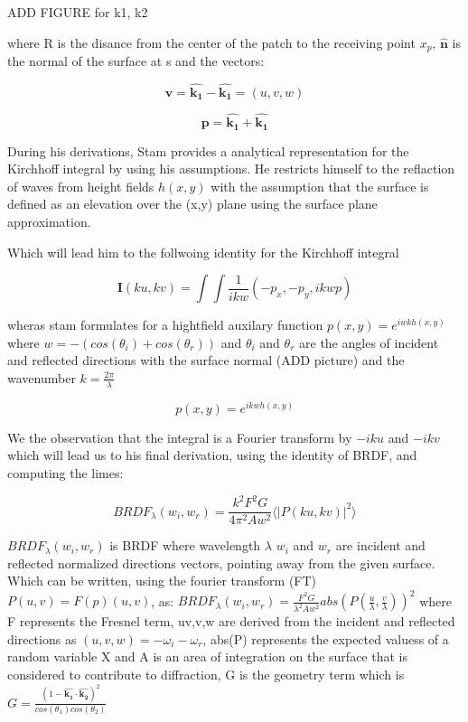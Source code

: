 ADD FIGURE for k1, k2

where R is the disance from the center of the patch to the receiving point $x_p$, $\hat{\mathbf{n}}$ is the normal of the surface at s and the vectors:

\begin{equation*}
    \mathbf{v} = \hat{\mathbf{k_1}} - \hat{\mathbf{k_1}}
               = (u,v,w)
\end{equation*}

\begin{equation*}
    \mathbf{p} = \hat{\mathbf{k_1}} + \hat{\mathbf{k_1}}
\end{equation*}


During his derivations, Stam provides a analytical representation for the Kirchhoff integral by using his assumptions. He restricts himself to the reflaction of waves from height fields $h(x,y)$ with the assumption that the surface is defined as an elevation over the (x,y) plane using the surface plane approximation.

Which will lead him to the follwoing identity for the Kirchhoff integral

\begin{equation}
    \mathbf{I}(ku, kv) = \int \int \frac{1}{ikw}(-p_x, -p_y, ikwp) 
\end{equation}

wheras stam formulates for a hightfield auxilary function $p(x,y) = e^{iwkh(x,y)}$ where $w = -(cos(\theta_i)+cos(\theta_r))$ and $\theta_i$ and $\theta_r$ are the angles of incident and reflected directions with the surface normal (ADD picture) and the wavenumber $k=\frac{2\pi}{\lambda}$

\begin{equation}
    p(x,y) = e^{ikwh(x,y)}
\end{equation}

We the observation that the integral is a Fourier transform by $-iku$ and $-ikv$
which will lead us to his final derivation, using the identity of BRDF, and computing the limes:

\begin{equation}
    BRDF_{\lambda}(w_i, w_r) = \frac{k^2 F^2 G}{4\pi^2 A w^2} \langle \left|P(ku, kv)\right|^2\rangle
\end{equation}

$BRDF_{\lambda}(w_i, w_r)$ is BRDF where wavelength $\lambda$ $w_i$ and $w_r$ are incident and reflected normalized directions vectors, pointing away from the given surface. Which can be written, using the fourier transform (FT) $P(u,v) = F(p)(u,v)$, as:
$BRDF_{\lambda}(w_i, w_r) = \frac{F^2 G}{\lambda^2 A w^2}abs(P(\frac{u}{\lambda},\frac{v}{\lambda}))^2$ where F represents the Fresnel term, uv,v,w are derived from the incident and reflected directions as $(u,v,w) = -\omega_i - \omega_r$, abs(P) represents the expected valuess of a random variable X and A is an area of integration on the surface that is considered to contribute to diffraction, G is the geometry term which is $G   =\frac{(1-\hat{\mathbf{k_1}}\cdot\hat{\mathbf{k_2}})^2}{cos(\theta_1)cos(\theta_2)}$

